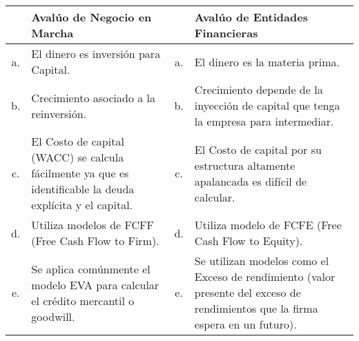 \documentclass{standalone}
\begin{document}
	\begin{tabular}{|cp{6.5cm}|cp{6.5cm}|}
		\hline 
		& \textbf{Avalúo de Negocio en Marcha} & 
		& \textbf{Avalúo de Entidades Financieras} \\
		\hline 
		\hline 
		a. & El dinero es inversión para Capital. & 
		a. & El dinero es la materia prima. \\[3mm] 
		b. & Crecimiento asociado a la reinversión. &
		b. & Crecimiento depende de la inyección de capital que tenga la empresa 
		para intermediar. \\[3mm] 
		c. & El Costo de capital (WACC) se calcula fácilmente ya que es identificable
		la deuda explícita y el capital. &
		c. & El Costo de capital por su estructura altamente apalancada es difícil
		de calcular. \\[3mm] 
		d. & Utiliza modelos de FCFF (Free Cash Flow to Firm). &
		d. & Utiliza modelo de FCFE (Free Cash Flow to Equity). \\[3mm] 
		e. & Se aplica comúnmente el modelo EVA para calcular el crédito mercantil o
		goodwill. &
		e. & Se utilizan modelos como el Exceso de rendimiento (valor presente del
		exceso de rendimientos que la firma espera en un futuro). \\
		\hline 
	\end{tabular}
\end{document}
